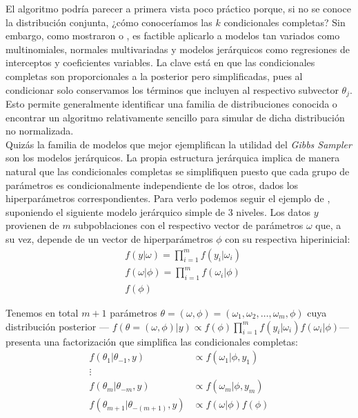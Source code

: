 El algoritmo podría parecer a primera vista poco práctico porque, si no se conoce la distribución conjunta, ¿cómo conoceríamos las $k$ condicionales completas? Sin embargo, como mostraron \textcite{GelfandSmith90} o \textcite{GelfandEtAl90}, es factible aplicarlo a modelos tan variados como multinomiales, normales multivariadas y modelos jerárquicos como regresiones de interceptos y coeficientes variables. La clave está en que las condicionales completas son proporcionales a la posterior pero simplificadas, pues al condicionar solo conservamos los términos que incluyen al respectivo subvector $\theta_j$. Esto permite generalmente identificar una familia de distribuciones conocida o encontrar un algoritmo relativamente sencillo para simular de dicha distribución no normalizada.\\

Quizás la familia de modelos que mejor ejemplifican la utilidad del \textit{Gibbs Sampler} son los modelos jerárquicos. La propia estructura jerárquica implica de manera natural que las condicionales completas se simplifiquen puesto que cada grupo de parámetros es condicionalmente independiente de los otros, dados los hiperparámetros correspondientes. Para verlo podemos seguir el ejemplo de \textcite{GP16}, suponiendo el siguiente modelo jerárquico simple de 3 niveles. Los datos $y$ provienen de $m$ subpoblaciones con el respectivo vector de parámetros $\omega$ que, a su vez, depende de un vector de hiperparámetros $\phi$ con su respectiva hiperinicial: 
\begin{align*}
&f(y|\omega) = \prod\limits_{i=1}^m f(y_i|\omega_i)\\
&f(\omega|\phi) = \prod\limits_{i=1}^m f(\omega_i|\phi)\\
&f(\phi)
\end{align*}

Tenemos en total $m+1$ parámetros $\theta = (\omega, \phi) = (\omega_1,\omega_2,\dots,\omega_m,\phi)$ cuya distribución posterior --- $f(\theta = (\omega, \phi)|y) \propto f(\phi)\prod\limits_{i=1}^m f(y_i|\omega_i)f(\omega_i|\phi)$--- presenta una factorización que simplifica las condicionales completas: 
\begin{align*}
f(\theta_1|\theta_{-1},y) &\propto f(\omega_1|\phi,y_1) \\
\vdots &\\
f(\theta_m|\theta_{-m},y) &\propto f(\omega_m|\phi,y_m) \\
f(\theta_{m+1}|\theta_{-(m+1)},y) &\propto f(\omega|\phi)f(\phi)
\end{align*}

